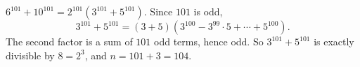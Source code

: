 $6^{101}+10^{101}=2^{101}\left(3^{101}+5^{101}\right)$. Since $101$ is odd,
\[3^{101}+5^{101}=(3+5)\left(3^{100}-3^{99}\cdot5+\cdots+5^{100}\right).\]
The second factor is a sum of $101$ odd terms, hence odd. So $3^{101}+5^{101}$ is exactly divisible by $8=2^3$, and $n=101+3=\boxed{104}$.
